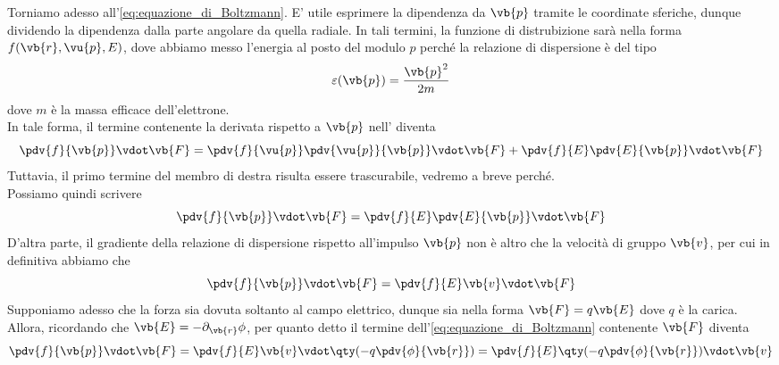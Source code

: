 Torniamo adesso all'\eqref{eq:equazione_di_Boltzmann}. E' utile esprimere la dipendenza da $\vb{p}$ tramite le coordinate sferiche, dunque dividendo la dipendenza dalla parte angolare da quella radiale. In tali termini, la funzione di distrubizione sarà nella forma $f(\vb{r},\vu{p},E)$, dove abbiamo messo l'energia al posto del modulo $p$ perché la relazione di dispersione è del tipo
\begin{equation*}
    \varepsilon(\vb{p})=
    \frac{\vb{p}^2}{2m}
\end{equation*}
dove $m$ è la massa efficace dell'elettrone.\\
In tale forma, il termine contenente la derivata rispetto a $\vb{p}$ nell' diventa
\begin{equation*}
    \pdv{f}{\vb{p}} \vdot \vb{F}
    =\pdv{f}{\vu{p}} \pdv{\vu{p}}{\vb{p}} \vdot \vb{F} + \pdv{f}{E} \pdv{E}{\vb{p}}\vdot \vb{F} 
\end{equation*}
Tuttavia, il primo termine del membro di destra risulta essere trascurabile, vedremo a breve perché.\\
Possiamo quindi scrivere
\begin{equation*}
    \pdv{f}{\vb{p}} \vdot \vb{F}
    =\pdv{f}{E} \pdv{E}{\vb{p}}\vdot \vb{F}
\end{equation*}
D'altra parte, il gradiente della relazione di dispersione rispetto all'impulso $\vb{p}$ non è altro che la velocità di gruppo $\vb{v}$, per cui in definitiva abbiamo che
\begin{equation*}
    \pdv{f}{\vb{p}} \vdot \vb{F}
    =\pdv{f}{E} \vb{v} \vdot \vb{F}
\end{equation*}
Supponiamo adesso che la forza sia dovuta soltanto al campo elettrico, dunque sia nella forma $\vb{F}=q\vb{E}$ dove $q$ è la carica. Allora, ricordando che $\vb{E}=-\partial_{\vb{r}} \phi$, per quanto detto il termine dell'\eqref{eq:equazione_di_Boltzmann} contenente $\vb{F}$ diventa
\begin{equation*}
    \pdv{f}{\vb{p}} \vdot \vb{F}
    =\pdv{f}{E} \vb{v} \vdot \qty( -q \pdv{\phi}{\vb{r}} )
    =\pdv{f}{E} \qty( -q \pdv{\phi}{\vb{r}} ) \vdot \vb{v}
\end{equation*}
